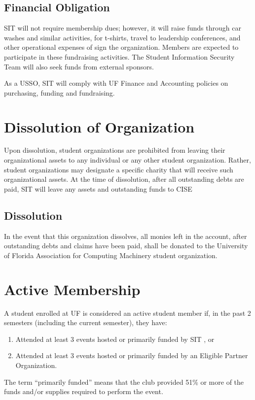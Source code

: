 \documentclass{article}
\def\clubname{SIT }
\def\clubfullname{Student Information Security Team }
\begin{document}
\subsection{Financial Obligation}
\clubname will not require membership dues; however, it will raise funds through car washes and similar activities, for t-shirts, travel to leadership conferences, and other operational expenses of sign the organization. Members are expected to participate in these fundraising activities. The \clubfullname will also seek funds from external sponsors.

As a USSO, \clubname will comply with UF Finance and Accounting policies on purchasing, funding and fundraising.


\section{Dissolution of Organization}
Upon dissolution, student organizations are prohibited from leaving their organizational assets to any individual or any other student organization. Rather, student organizations may designate a specific charity that will receive such organizational assets. At the time of dissolution, after all outstanding debts are paid, \clubname will leave any assets and outstanding funds to CISE

\subsection{Dissolution}
In the event that this organization dissolves, all monies left in the account, after outstanding debts and claims have been paid, shall be donated to the University of Florida Association for Computing Machinery student organization.

\section{Active Membership}
A student enrolled at UF is considered an active student member if, in the past 2 semesters (including the current semester), they have:
\begin{enumerate}
	\item Attended at least 3 events hosted or primarily funded by \clubname, or
	\item Attended at least 3 events hosted or primarily funded by an Eligible Partner Organization.
\end{enumerate}
The term ``primarily funded'' means that the club provided 51\% or more of the funds and/or supplies required to perform the event.
\end{document}
